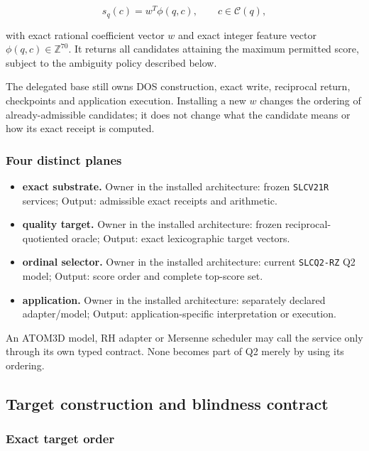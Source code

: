 \[
s_q(c)=w^T\phi(q,c),\qquad c\in\mathcal C(q),
\]

with exact rational coefficient vector \(w\) and exact integer feature
vector \(\phi(q,c)\in\mathbb Z^{70}\). It returns all candidates
attaining the maximum permitted score, subject to the ambiguity policy
described below.

The delegated base still owns DOS construction, exact write, reciprocal
return, checkpoints and application execution. Installing a new \(w\)
changes the ordering of already-admissible candidates; it does not
change what the candidate means or how its exact receipt is computed.

\subsubsection{Four distinct planes}\label{viii-ch07-four-distinct-planes}

\begin{itemize}
\tightlist
\item
  \textbf{exact substrate.} Owner in the installed architecture: frozen
  \texttt{SLCV21R} services; Output: admissible exact receipts and
  arithmetic.
\item
  \textbf{quality target.} Owner in the installed architecture: frozen
  reciprocal-quotiented oracle; Output: exact lexicographic target
  vectors.
\item
  \textbf{ordinal selector.} Owner in the installed architecture:
  current \texttt{SLCQ2-RZ} Q2 model; Output: score order and complete
  top-score set.
\item
  \textbf{application.} Owner in the installed architecture: separately
  declared adapter/model; Output: application-specific interpretation or
  execution.
\end{itemize}

An ATOM3D model, RH adapter or Mersenne scheduler may call the service
only through its own typed contract. None becomes part of Q2 merely by
using its ordering.

\subsection{Target construction and blindness
contract}\label{viii-ch07-target-construction-and-blindness-contract}

\subsubsection{Exact target order}\label{viii-ch07-exact-target-order}

